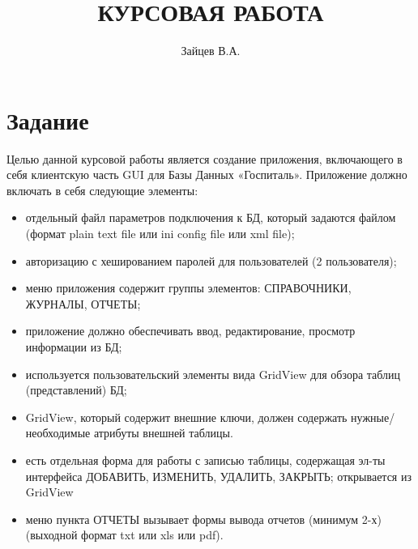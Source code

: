 \documentclass[specialist,
substylefile = spbu_report.rtx,
subf,href,colorlinks=true, 12pt]{disser}
\begin{document}
	
	
	\title{\textbf{КУРСОВАЯ РАБОТА}}
	
	
	\author{Зайцев В.А.}
	
	
	\date{\number\year}
	
	\maketitle
	\pagestyle{plain}
	\newpage
	\tableofcontents
	
	\section{Задание}
	Целью данной курсовой работы является создание приложения, включающего в себя клиентскую часть GUI для Базы Данных «Госпиталь». Приложение должно включать в себя следующие элементы:
	\vspace{-5pt}
	\begin{itemize}
		\setlength{\itemsep}{-2pt}
		\item[а)] отдельный файл параметров подключения к БД, который задаются файлом (формат plain text file или ini config file или xml file);
		\item[б)] авторизацию с хешированием паролей для пользователей (2 пользователя);
		\item[в)] меню приложения содержит группы элементов: СПРАВОЧНИКИ, ЖУРНАЛЫ, ОТЧЕТЫ;
		\item[г)] приложение должно обеспечивать ввод, редактирование, просмотр информации из БД;
		\item[д)] используется пользовательский элементы вида GridView для обзора таблиц (представлений) БД;
		\item[е)] GridView, который содержит внешние ключи, должен содержать нужные/необходимые атрибуты внешней таблицы.
		\item[ж)] есть отдельная форма для работы с записью таблицы, содержащая эл-ты интерфейса ДОБАВИТЬ, ИЗМЕНИТЬ, УДАЛИТЬ, ЗАКРЫТЬ; открывается из GridView
		\item[з)] меню пункта ОТЧЕТЫ вызывает формы вывода отчетов (минимум 2-х) (выходной формат txt или xls или pdf).
	\end{itemize}
	
\end{document}
